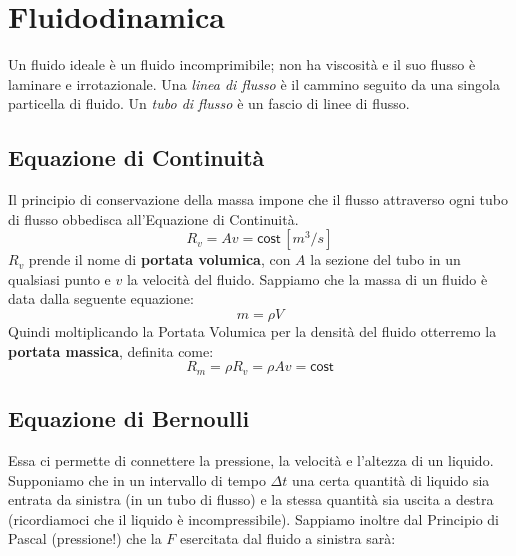 \chapter{Fluidodinamica}
Un fluido ideale è un fluido incomprimibile; non ha viscosità e il suo flusso è
laminare e irrotazionale. Una \textit{linea di flusso} è il cammino seguito da 
una singola particella di fluido. Un \textit{tubo di flusso} è un fascio di 
linee di flusso.

    \section{Equazione di Continuità} Il principio di conservazione della massa
    impone che il flusso attraverso ogni tubo di flusso obbedisca all'Equazione
    di Continuità.
        \begin{equation}
            R_v = Av = \textsf{cost} \, [m^3/s]
        \end{equation}
    $R_v$ prende il nome di \textbf{portata volumica}, con $A$ la sezione del 
    tubo in un qualsiasi punto e $v$ la velocità del fluido.
    Sappiamo che la massa di un fluido è data dalla seguente equazione:
        \begin{equation*}
            m = \rho V
        \end{equation*}
    Quindi moltiplicando la Portata Volumica per la densità del fluido 
    otterremo la \textbf{portata massica}, definita come:
        \begin{equation}
            R_m = \rho R_v = \rho A v = \textsf{cost}
        \end{equation}

    \section{Equazione di Bernoulli} Essa ci permette di connettere la 
    pressione, la velocità e l'altezza di un liquido. Supponiamo che in un 
    intervallo di tempo $\Delta t$ una certa quantità di liquido sia entrata da
    sinistra (in un tubo di flusso) e la stessa quantità sia uscita a destra 
    (ricordiamoci che il liquido è incompressibile). Sappiamo inoltre dal 
    Principio di Pascal (pressione!) che la $F$ esercitata dal fluido a 
    sinistra sarà:
